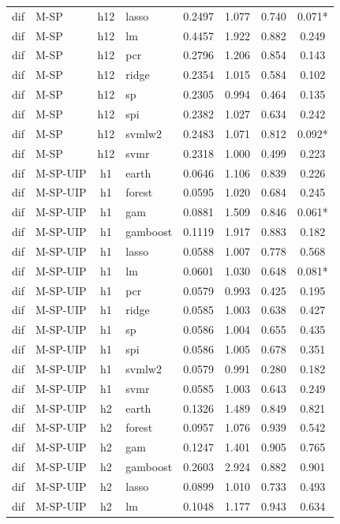 \begin{ThreePartTable}
\begin{longtable}[t]{llclcccc}
dif & M-SP & h12 & lasso & 0.2497 & 1.077 & 0.740 & 0.071*\\
dif & M-SP & h12 & lm & 0.4457 & 1.922 & 0.882 & 0.249\\
dif & M-SP & h12 & pcr & 0.2796 & 1.206 & 0.854 & 0.143\\
dif & M-SP & h12 & ridge & 0.2354 & 1.015 & 0.584 & 0.102\\
dif & M-SP & h12 & sp & 0.2305 & 0.994 & 0.464 & 0.135\\
dif & M-SP & h12 & spi & 0.2382 & 1.027 & 0.634 & 0.242\\
dif & M-SP & h12 & svmlw2 & 0.2483 & 1.071 & 0.812 & 0.092*\\
dif & M-SP & h12 & svmr & 0.2318 & 1.000 & 0.499 & 0.223\\
\addlinespace
dif & M-SP-UIP & h1 & earth & 0.0646 & 1.106 & 0.839 & 0.226\\
dif & M-SP-UIP & h1 & forest & 0.0595 & 1.020 & 0.684 & 0.245\\
dif & M-SP-UIP & h1 & gam & 0.0881 & 1.509 & 0.846 & 0.061*\\
dif & M-SP-UIP & h1 & gamboost & 0.1119 & 1.917 & 0.883 & 0.182\\
dif & M-SP-UIP & h1 & lasso & 0.0588 & 1.007 & 0.778 & 0.568\\
dif & M-SP-UIP & h1 & lm & 0.0601 & 1.030 & 0.648 & 0.081*\\
dif & M-SP-UIP & h1 & pcr & 0.0579 & 0.993 & 0.425 & 0.195\\
dif & M-SP-UIP & h1 & ridge & 0.0585 & 1.003 & 0.638 & 0.427\\
dif & M-SP-UIP & h1 & sp & 0.0586 & 1.004 & 0.655 & 0.435\\
dif & M-SP-UIP & h1 & spi & 0.0586 & 1.005 & 0.678 & 0.351\\
dif & M-SP-UIP & h1 & svmlw2 & 0.0579 & 0.991 & 0.280 & 0.182\\
dif & M-SP-UIP & h1 & svmr & 0.0585 & 1.003 & 0.643 & 0.249\\
\addlinespace
dif & M-SP-UIP & h2 & earth & 0.1326 & 1.489 & 0.849 & 0.821\\
dif & M-SP-UIP & h2 & forest & 0.0957 & 1.076 & 0.939 & 0.542\\
dif & M-SP-UIP & h2 & gam & 0.1247 & 1.401 & 0.905 & 0.765\\
dif & M-SP-UIP & h2 & gamboost & 0.2603 & 2.924 & 0.882 & 0.901\\
dif & M-SP-UIP & h2 & lasso & 0.0899 & 1.010 & 0.733 & 0.493\\
dif & M-SP-UIP & h2 & lm & 0.1048 & 1.177 & 0.943 & 0.634\\

\end{longtable}
\end{ThreePartTable}
